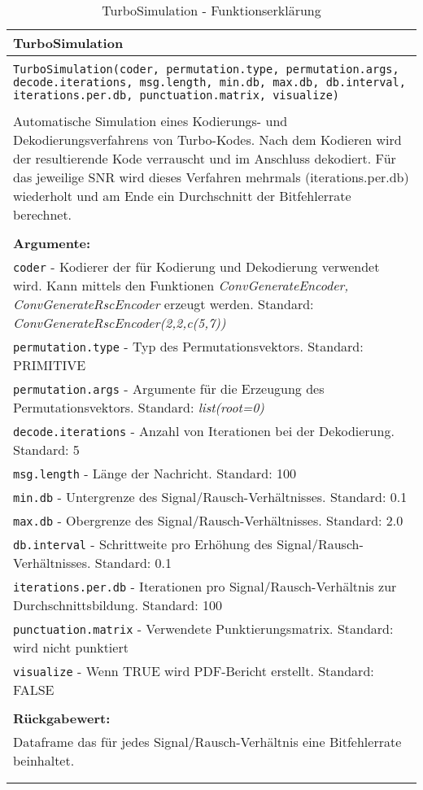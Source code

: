 \begin{longtable}{|p{\textwidth}|}
\hline
\rowcolor{lightblue}TurboSimulation\\
\hline
\\
\texttt{TurboSimulation(coder, permutation.type, permutation.args, decode.iterations, msg.length, min.db, max.db, db.interval, iterations.per.db, punctuation.matrix, visualize)}\\
\\
Automatische Simulation eines Kodierungs- und Dekodierungsverfahrens von Turbo-Kodes. Nach dem Kodieren wird der resultierende Kode verrauscht und im Anschluss dekodiert. Für das jeweilige SNR wird dieses Verfahren mehrmals (iterations.per.db) wiederholt und am Ende ein Durchschnitt der Bitfehlerrate berechnet.\\
\\
\textbf{Argumente:}\\
\texttt{coder} - Kodierer der für Kodierung und Dekodierung verwendet wird. Kann mittels den Funktionen \emph{ConvGenerateEncoder, ConvGenerateRscEncoder} erzeugt werden. Standard: \emph{ConvGenerateRscEncoder(2,2,c(5,7))}\\
\texttt{permutation.type} - Typ des Permutationsvektors. Standard: PRIMITIVE\\
\texttt{permutation.args} - Argumente für die Erzeugung des Permutationsvektors. Standard: \emph{list(root=0)}\\
\texttt{decode.iterations} - Anzahl von Iterationen bei der Dekodierung. Standard: 5\\
\texttt{msg.length} - Länge der Nachricht. Standard: 100\\
\texttt{min.db} - Untergrenze des Signal/Rausch-Verhältnisses. Standard: 0.1\\
\texttt{max.db} - Obergrenze des Signal/Rausch-Verhältnisses. Standard: 2.0\\
\texttt{db.interval} - Schrittweite pro Erhöhung des Signal/Rausch-Verhältnisses. Standard: 0.1\\
\texttt{iterations.per.db} - Iterationen pro Signal/Rausch-Verhältnis zur Durchschnittsbildung. Standard: 100\\
\texttt{punctuation.matrix} - Verwendete Punktierungsmatrix. Standard: wird nicht punktiert\\
\texttt{visualize} - Wenn TRUE wird PDF-Bericht erstellt. Standard: FALSE\\
\\
\textbf{Rückgabewert:}\\
Dataframe das für jedes Signal/Rausch-Verhältnis eine Bitfehlerrate beinhaltet.\\
\\
\hline
\caption{TurboSimulation - Funktionserklärung}
\end{longtable}